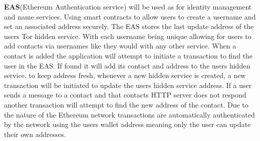 \documentclass[../main/main.tex]{subfiles}
\begin{document}
\begin{center}


\end{center}

\textbf{EAS}(Ethereum Authentication service) will be used as for identity management and name services. 
Using smart contracts to allow users to create a username and set an associated address securely. 
The EAS stores the last update address of the users Tor hidden service. With
each username being unique allowing for users to add contacts via usernames like they would with any other service. 
When a contact is added the application will attempt to initiate a transaction to find the user in the EAS. 
If found it will add its contact and address to the users hidden service. 
to keep address fresh, whenever a new hidden service is created, a new transaction will be initiated to update the users hidden service address. 
If a user sends a message to a contact and that contacts HTTP server does not respond another transaction will attempt to find the new address of the contact.
Due to the nature of the Ethereum network transactions are automatically authenticated by the network using the users wallet address \cite{ETH} meaning only the user can update their own addresses.
\end{document}
